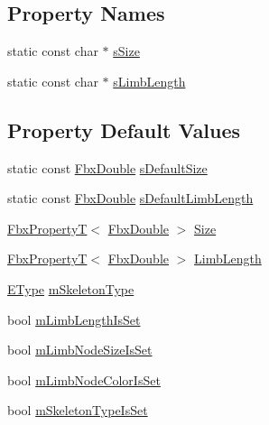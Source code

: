 \subsection*{Property Names}
\begin{DoxyCompactItemize}
\item 
static const char $\ast$ \hyperlink{class_fbx_skeleton_a311e444376931fb3c3b0ce1b7444eddb}{s\+Size}
\item 
static const char $\ast$ \hyperlink{class_fbx_skeleton_ac243ade080949dfcaa564d95e2f4aa6b}{s\+Limb\+Length}
\end{DoxyCompactItemize}
\subsection*{Property Default Values}
\begin{DoxyCompactItemize}
\item 
static const \hyperlink{fbxtypes_8h_a171e72a1c46fc15c1a6c9c31948c1c5b}{Fbx\+Double} \hyperlink{class_fbx_skeleton_aabac60f53d2b665f37ac74e7ac9a402a}{s\+Default\+Size}
\item 
static const \hyperlink{fbxtypes_8h_a171e72a1c46fc15c1a6c9c31948c1c5b}{Fbx\+Double} \hyperlink{class_fbx_skeleton_a61aa3623c65047b3e7e66a173711b1ef}{s\+Default\+Limb\+Length}
\item 
\hyperlink{class_fbx_property_t}{Fbx\+PropertyT}$<$ \hyperlink{fbxtypes_8h_a171e72a1c46fc15c1a6c9c31948c1c5b}{Fbx\+Double} $>$ \hyperlink{class_fbx_skeleton_aecaa95bc659ea1804ec5885d9116c1c6}{Size}
\item 
\hyperlink{class_fbx_property_t}{Fbx\+PropertyT}$<$ \hyperlink{fbxtypes_8h_a171e72a1c46fc15c1a6c9c31948c1c5b}{Fbx\+Double} $>$ \hyperlink{class_fbx_skeleton_ac86811d94d673bbc1558eca1066311a2}{Limb\+Length}
\item 
\hyperlink{class_fbx_skeleton_ae067f8fec201e5e3572f039e37ee1c6b}{E\+Type} \hyperlink{class_fbx_skeleton_a8c5424b8334b260fc668a42df4cb8558}{m\+Skeleton\+Type}
\item 
bool \hyperlink{class_fbx_skeleton_a59c001b86207731c5c26ca38ec1e78f6}{m\+Limb\+Length\+Is\+Set}
\item 
bool \hyperlink{class_fbx_skeleton_a1e0cfb9088fa334ff5c97b92a5d510dd}{m\+Limb\+Node\+Size\+Is\+Set}
\item 
bool \hyperlink{class_fbx_skeleton_a9efa86b9d964e60e8a9ed67a4851fc9f}{m\+Limb\+Node\+Color\+Is\+Set}
\item 
bool \hyperlink{class_fbx_skeleton_a0db3601d505f1e70eb64dbbfa881a91a}{m\+Skeleton\+Type\+Is\+Set}

\end{DoxyCompactItemize}
